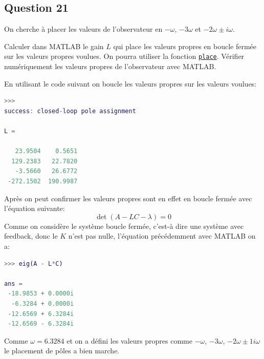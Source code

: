 \documentclass[class=article, crop=false]{standalone}
\begin{document}
\subsection{Question 21}
On cherche à placer les valeurs de l'observateur en $-\omega$, $-3\omega$ et $-2\omega \pm i\omega$.
\begin{exercise}
    Calculer dans MATLAB le gain $L$ qui place les valeurs propres en boucle fermée sur les valeurs propres voulues. On pourra utiliser la fonction \href{https://www.mathworks.com/help/control/ref/place.html}{\texttt{place}}. Vérifier numériquement les valeurs propres de l'observateur avec MATLAB.
\end{exercise}
\begin{resolution}
    En utilisant le code suivant on boucle les valeurs propres sur les valeurs voulues:
    \begin{scriptsize}\mycode
        
    \end{scriptsize}
    \begin{scriptsize}\mycode
        \begin{lstlisting}[language=Matlab]
>>>
success: closed-loop pole assignment

L =

   23.9504    0.5651
  129.2383   22.7820
   -3.5660   26.6772
 -272.1502  190.9987
        \end{lstlisting}
    \end{scriptsize}
    Après on peut confirmer les valeurs propres sont en effet en boucle fermée avec l'équation suivante:
    \begin{equation}
        \det (A - L C - \lambda) = 0
    \end{equation}
    Comme on considère le système boucle fermée, c'est-à dire une système avec feedback, donc le $K$ n'est pas nulle, l'équation précédemment avec MATLAB on a:
    \begin{scriptsize}\mycode
        \begin{lstlisting}[language=Matlab]
>>> eig(A - L*C)

ans =
 -18.9853 + 0.0000i
  -6.3284 + 0.0000i
 -12.6569 + 6.3284i
 -12.6569 - 6.3284i
        \end{lstlisting}
    \end{scriptsize}
    Comme $\omega = 6.3284$ et on a défini les valeurs propres comme $-\omega$, $-3\omega$, $-2\omega\pm 1 i \omega$ le placement de pôles a bien marche.
\end{resolution}
\end{document}

